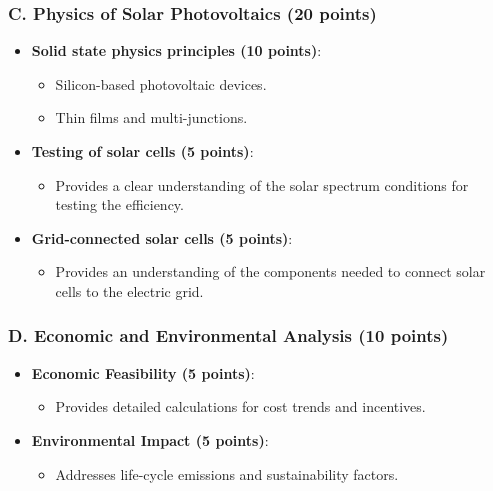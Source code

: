 \documentclass[11pt]{article}
\begin{document}
\subsubsection*{C. Physics of Solar Photovoltaics (20 points)}
\begin{itemize}
    \item \textbf{Solid state physics principles (10 points)}:
    \begin{itemize}
        \item Silicon-based photovoltaic devices.
        \item Thin films and multi-junctions.
    \end{itemize}
    \item \textbf{Testing of solar cells (5 points)}:
    \begin{itemize}
        \item Provides a clear understanding of the solar spectrum conditions for testing the efficiency.
    \end{itemize}
    \item \textbf{Grid-connected solar cells (5 points)}:
    \begin{itemize}
        \item Provides an understanding of the components needed to connect solar cells to the electric grid.
    \end{itemize}
\end{itemize}

\subsubsection*{D. Economic and Environmental Analysis (10 points)}
\begin{itemize}
    \item \textbf{Economic Feasibility (5 points)}:
    \begin{itemize}
        \item Provides detailed calculations for cost trends and incentives.
    \end{itemize}
    \item \textbf{Environmental Impact (5 points)}:
    \begin{itemize}
        \item Addresses life-cycle emissions and sustainability factors.
    \end{itemize}
\end{itemize}
\end{document}

